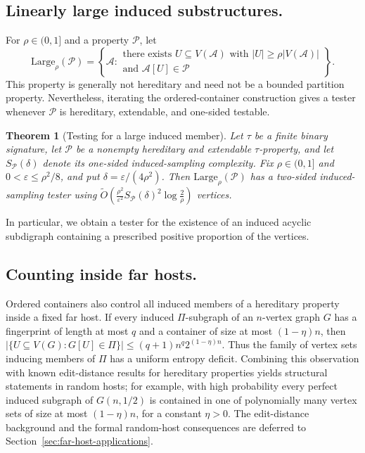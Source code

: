 \documentclass[11pt,reqno,letterpaper]{amsart}
\newcommand{\cA}{{\mathcal A}}
\newcommand{\cP}{{\mathcal P}}
\theoremstyle{plain}
\newtheorem{thm}{Theorem}[section]
\theoremstyle{remark}
\begin{document}
\subsection*{Linearly large induced substructures.}
For $\rho\in(0,1]$ and a property $\cP$, let
\[
\mathrm{Large}_\rho(\cP)
=
\left\{
\cA:
\begin{array}{c}
\text{there exists }U\subseteq V(\cA)\text{ with }|U|\geq\rho|V(\cA)|\\[-2pt]
\text{and }\cA[U]\in\cP
\end{array}
\right\}.
\]
This property is generally not hereditary and need not be a bounded partition
property.  Nevertheless, iterating the ordered-container construction gives a
tester whenever $\cP$ is hereditary, extendable, and one-sided testable.

\begin{thm}[Testing for a large induced member]
\label{thm:relational-large-induced-intro}
Let $\tau$ be a finite binary signature, let $\cP$ be a nonempty hereditary and
extendable $\tau$-property, and let $S_{\cP}(\delta)$ denote its one-sided
induced-sampling complexity.  Fix $\rho\in(0,1]$ and
$0<\varepsilon\leq\rho^2/8$, and put $\delta=\varepsilon/(4\rho^2)$.  Then
$\mathrm{Large}_\rho(\cP)$ has a two-sided induced-sampling tester using
\(\widetilde O\!\left( \frac{\rho^2}{\varepsilon^2} S_{\cP}(\delta)^2 \log\frac2\rho \right)\)
vertices.
\end{thm}

In particular, we obtain a tester for the existence of an induced acyclic
subdigraph containing a prescribed positive proportion of the vertices.

\subsection*{Counting inside far hosts.}
Ordered containers also control all induced members of a hereditary property
inside a fixed far host.  If every induced $\Pi$-subgraph of an $n$-vertex
graph $G$ has a fingerprint of length at most $q$ and a container of size at
most $(1-\eta)n$, then
\(\bigl|\{U\subseteq V(G):G[U]\in\Pi\}\bigr| \leq (q+1)n^q2^{(1-\eta)n}.\)
Thus the family of vertex sets inducing members of $\Pi$ has a uniform entropy
deficit.  Combining this observation with known edit-distance results for
hereditary properties yields structural statements in random hosts; for
example, with high probability every perfect induced subgraph of $G(n,1/2)$ is
contained in one of polynomially many vertex sets of size at most
$(1-\eta)n$, for a constant $\eta>0$.  The edit-distance background and the
formal random-host consequences are deferred to Section~\ref{sec:far-host-applications}.
\end{document}
